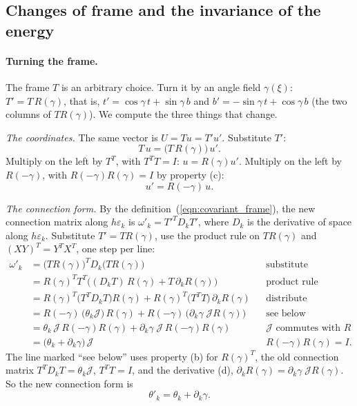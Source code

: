 \subsection{Changes of frame and the invariance of the energy}
\label{section:r3_covariance}

\paragraph{Turning the frame.} The frame $T$ is an arbitrary choice. Turn it by an angle field $\gamma(\xi)$: $T' = T\,R(\gamma)$, that is, $t' = \cos\gamma\, t + \sin\gamma\, b$ and $b' = -\sin\gamma\, t + \cos\gamma\, b$ (the two columns of $T R(\gamma)$). We compute the three things that change.

\emph{The coordinates.} The same vector is $U = Tu = T'u'$. Substitute $T'$:
\begin{equation*}
T\,u = \big(T\, R(\gamma)\big)\,u' .
\end{equation*}
Multiply on the left by $T^T$, with $T^TT = I$: $u = R(\gamma)u'$. Multiply on the left by $R(-\gamma)$, with $R(-\gamma)R(\gamma) = I$ by property (c):
\begin{equation*}
u' = R(-\gamma)\,u .
\end{equation*}

\emph{The connection form.} By the definition~(\ref{eqn:covariant_frame}), the new connection matrix along $h\varepsilon_k$ is $\omega'_k = T'^TD_kT'$, where $D_k$ is the derivative of space along $h\varepsilon_k$. Substitute $T' = TR(\gamma)$, use the product rule on $TR(\gamma)$ and $(XY)^T = Y^TX^T$, one step per line:
\begin{align*}
\omega'_k &= \big(TR(\gamma)\big)^T D_k\big(TR(\gamma)\big) && \text{substitute} \\
&= R(\gamma)^TT^T\big((D_kT)\,R(\gamma) + T\,\partial_kR(\gamma)\big) && \text{product rule} \\
&= R(\gamma)^T\big(T^TD_kT\big)R(\gamma) + R(\gamma)^T\big(T^TT\big)\,\partial_kR(\gamma) && \text{distribute} \\
&= R(-\gamma)\,\big(\theta_k\mathcal J\big)\,R(\gamma) + R(-\gamma)\,\big(\partial_k\gamma\;\mathcal J R(\gamma)\big) && \text{see below} \\
&= \theta_k\,\mathcal J\, R(-\gamma)R(\gamma) + \partial_k\gamma\;\mathcal J\,R(-\gamma)R(\gamma) && \mathcal J \text{ commutes with } R \\
&= \big(\theta_k + \partial_k\gamma\big)\,\mathcal J && R(-\gamma)R(\gamma) = I .
\end{align*}
The line marked ``see below'' uses property (b) for $R(\gamma)^T$, the old connection matrix $T^TD_kT = \theta_k\mathcal J$, $T^TT = I$, and the derivative (d), $\partial_kR(\gamma) = \partial_k\gamma\;\mathcal JR(\gamma)$.
So the new connection form is
\begin{equation*}
\theta'_k = \theta_k + \partial_k\gamma .
\end{equation*}


